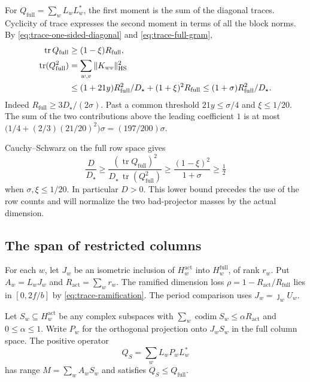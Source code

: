 \leavevmode{}%
For \(Q_{\mathrm{full}}=\sum_w L_wL_w^*\), the first moment is the sum
of the diagonal traces. Cyclicity of trace expresses the second
moment in terms of all the block norms. By
\eqref{eq:trace-one-sided-diagonal} and \eqref{eq:trace-full-gram},
\begin{equation}
\label{eq:trace-full-moments}
\begin{aligned}
 \operatorname{tr}Q_{\mathrm{full}}
    &\ge (1-\xi)R_{\mathrm{full}},\\
 \operatorname{tr}(Q_{\mathrm{full}}^2)
    &=\sum_{w,v}\|K_{wv}\|_{\rm HS}^2\\
    &\le (1+21y)R_{\mathrm{full}}^2/D_\star
          +(1+\xi)^2R_{\mathrm{full}}
      \le (1+\sigma)R_{\mathrm{full}}^2/D_\star .
\end{aligned}
\end{equation}
Indeed \(R_{\mathrm{full}}\ge3D_\star/(2\sigma)\).
Past a common threshold \(21y\le\sigma/4\) and \(\xi\le1/20\).
The sum of the two contributions above the leading coefficient
\(1\) is at most \(\bigl(1/4+(2/3)(21/20)^2\bigr)\sigma
=(197/200)\sigma\).

\leavevmode{}%
Cauchy--Schwarz on the full row space gives
\[
 \frac{D}{D_\star}
 \ge\frac{(\operatorname{tr}Q_{\mathrm{full}})^2}
 {D_\star\,\operatorname{tr}(Q_{\mathrm{full}}^2)}
 \ge \frac{(1-\xi)^2}{1+\sigma}\ge\tfrac12
\]
when \(\sigma,\xi\le1/20\). In particular \(D>0\).
This lower bound precedes the use of the row counts and will
normalize the two bad-projector masses by the actual dimension.

\subsection{The span of restricted columns}
\leavevmode{}%
\leavevmode{}%
For each \(w\), let \(J_w\) be an isometric inclusion of
\(H_w^{\mathrm{act}}\) into \(H_w^{\mathrm{full}}\), of rank \(r_w\).
Put \(A_w=L_wJ_w\) and \(R_{\mathrm{act}}=\sum_w r_w\).
The ramified dimension loss \(\rho=1-R_{\mathrm{act}}/R_{\mathrm{full}}\)
lies in \([0,2f/b]\) by \eqref{eq:trace-ramification}. The
period comparison uses \(J_w=\jmath_wU_w\).

Let \(S_w\subseteq H_w^{\mathrm{act}}\) be any complex subspaces with
\(\sum_w\operatorname{codim}S_w\le\alpha R_{\mathrm{act}}\)
and \(0\le\alpha\le1\). Write \(P_w\) for the orthogonal projection
onto \(J_wS_w\) in the full column space. The positive operator
\[
 Q_S=\sum_w L_wP_wL_w^*
\]
has range \(M=\sum_w A_w S_w\) and satisfies \(Q_S\le Q_{\mathrm{full}}\).

